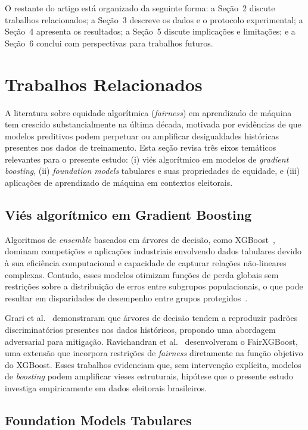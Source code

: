 \documentclass[12pt]{article}
\begin{document}
O restante do artigo está organizado da seguinte forma: a Seção~2
discute trabalhos relacionados; a Seção~3 descreve os dados e o
protocolo experimental; a Seção~4 apresenta os resultados; a
Seção~5 discute implicações e limitações; e a Seção~6 conclui com
perspectivas para trabalhos futuros.

\section{Trabalhos Relacionados}

A literatura sobre equidade algorítmica (\textit{fairness}) em aprendizado de máquina tem crescido substancialmente na última década, motivada por evidências de que modelos preditivos podem perpetuar ou amplificar desigualdades históricas presentes nos dados de treinamento. Esta seção revisa três eixos temáticos relevantes para o presente estudo: (i) viés algorítmico em modelos de \textit{gradient boosting}, (ii) \textit{foundation models} tabulares e suas propriedades de equidade, e (iii) aplicações de aprendizado de máquina em contextos eleitorais.

\subsection{Viés algorítmico em Gradient Boosting}

Algoritmos de \textit{ensemble} baseados em árvores de decisão, como XGBoost~\cite{chen:2016}, dominam competições e aplicações industriais envolvendo dados tabulares devido à sua eficiência computacional e capacidade de capturar relações não-lineares complexas. Contudo, esses modelos otimizam funções de perda globais sem restrições sobre a distribuição de erros entre subgrupos populacionais, o que pode resultar em disparidades de desempenho entre grupos protegidos~\cite{grari:2020}.

Grari et al.~\cite{grari:2020} demonstraram que árvores de decisão tendem a reproduzir padrões discriminatórios presentes nos dados históricos, propondo uma abordagem adversarial para mitigação. Ravichandran et al.~\cite{ravichandran:2020} desenvolveram o FairXGBoost, uma extensão que incorpora restrições de \textit{fairness} diretamente na função objetivo do XGBoost. Esses trabalhos evidenciam que, sem intervenção explícita, modelos de \textit{boosting} podem amplificar vieses estruturais, hipótese que o presente estudo investiga empiricamente em dados eleitorais brasileiros.

\subsection{Foundation Models Tabulares}
\end{document}

